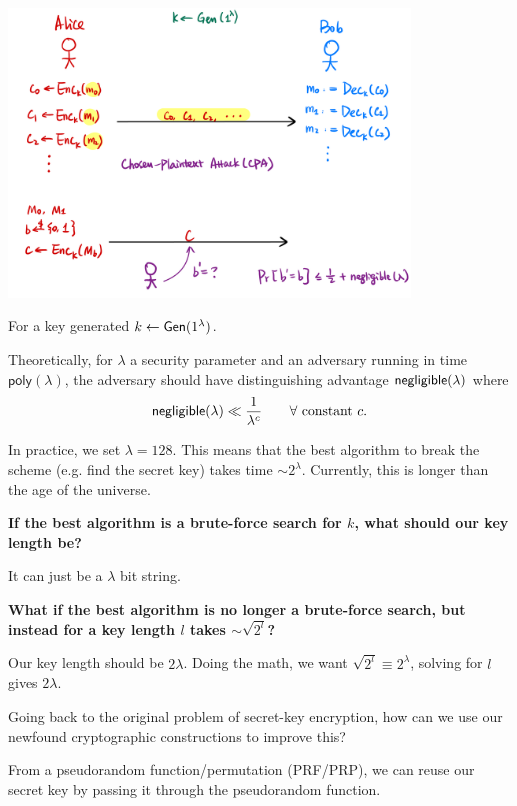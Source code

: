 \begin{center}
    \includegraphics[width=0.8\textwidth]{images/2023-01-31/computational-security.png}
\end{center}

For a key generated $k\leftarrow \operatorname{\mathsf{Gen}}(1^\lambda)$.

Theoretically, for $\lambda$ a security parameter and an adversary running in time $\mathsf{poly}(\lambda)$, the adversary should have distinguishing advantage $\operatorname{\mathsf{negligible}}(\lambda)$ where
\[\operatorname{\mathsf{negligible}}(\lambda) \ll \frac{1}{\lambda^c}\qquad \forall\text{ constant }c.\]

In practice, we set $\lambda = 128$. This means that the best algorithm to break the scheme (e.g. find the secret key) takes time $\sim 2^\lambda$. Currently, this is longer than the age of the universe.

\begin{example}
    \textbf{If the best algorithm is a brute-force search for $k$, what should our key length be?}

    It can just be a $\lambda$ bit string.
\end{example}
\begin{example*}
    \textbf{What if the best algorithm is no longer a brute-force search, but instead for a key length $l$ takes $\sim \sqrt{2^l}$?}

    Our key length should be $2\lambda$. Doing the math, we want $\sqrt{2^l} \equiv 2^\lambda$, solving for $l$ gives $2\lambda$.
\end{example*}

Going back to the original problem of secret-key encryption, how can we use our newfound cryptographic constructions to improve this?

From a pseudorandom function/permutation (PRF/PRP), we can reuse our secret key by passing it through the pseudorandom function.

